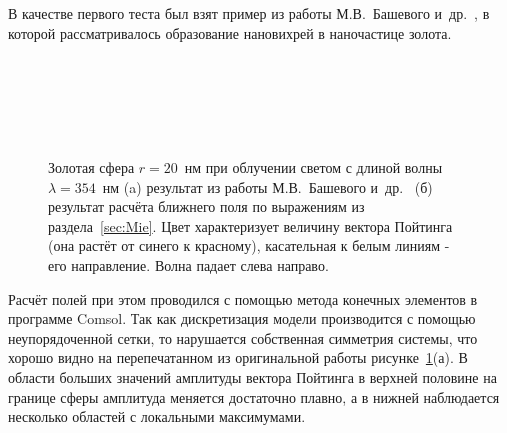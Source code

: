В качестве первого теста был взят пример из работы
М.В.~Башевого и~др.~\cite{Bashevoy-2005}, в которой рассматривалось
образование нановихрей в наночастице золота.
\begin{figure}[p]  %
  \begin{minipage}[ht]{0.99\linewidth}        
  \end{minipage}\\
  \vfill
  \begin{minipage}[ht]{0.99\linewidth}        
  \end{minipage}\\
  \vfill
  \begin{minipage}[ht]{0.99\linewidth}
  \end{minipage}\\
  \begin{minipage}[ht]{0.99\linewidth}
  \end{minipage}
  \caption{Золотая сфера $r=20$~нм при облучении светом с длиной волны
    $\lambda=354$~нм (a) результат из работы М.В.~Башевого
    и~др.~\cite{Bashevoy-2005} (б) результат расчёта ближнего поля по
    выражениям из раздела~\ref{sec:Mie}. Цвет характеризует величину
    вектора Пойтинга (она растёт от синего к красному),
    касательная к белым линиям - его направление. Волна падает слева
    направо.\label{img:vortex}}
\end{figure}
Расчёт полей при этом проводился с помощью метода конечных элементов в
программе Comsol. Так как дискретизация модели производится с помощью
неупорядоченной сетки, то нарушается собственная симметрия системы,
что хорошо видно на перепечатанном из оригинальной работы
рисунке~\ref{img:vortex}(а).  В области больших значений амплитуды
вектора Пойтинга в верхней половине на границе сферы амплитуда
меняется достаточно плавно, а в нижней наблюдается несколько областей
с локальными максимумами.

